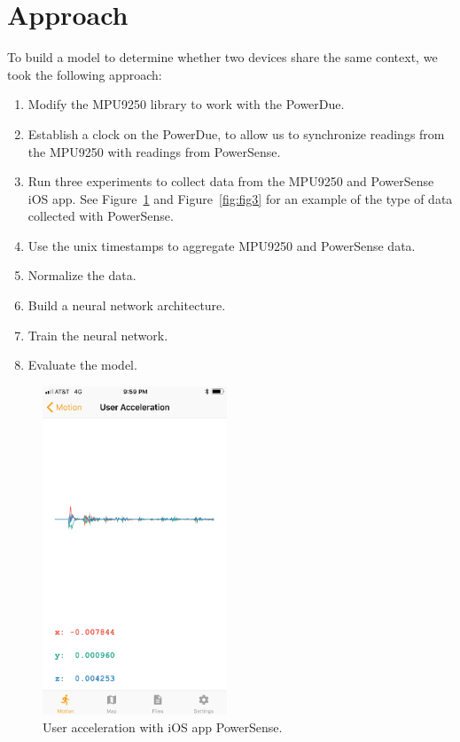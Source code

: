 \documentclass[journal]{IEEEtranTIE}
\begin{document}
\section{Approach}

To build a model to determine whether two devices share the same context, we
took the following approach:

\begin{enumerate}
\item Modify the MPU9250 library to work with the PowerDue.
\item Establish a clock on the PowerDue, to allow us to synchronize readings
      from the MPU9250 with readings from PowerSense.
\item Run three experiments to collect data from the MPU9250 and PowerSense iOS
      app. See Figure~\ref{fig:fig2} and Figure~\ref{fig:fig3} for an example of
      the type of data collected with PowerSense.
\item Use the unix timestamps to aggregate MPU9250 and PowerSense data.
\item Normalize the data.
\item Build a neural network architecture.
\item Train the neural network.
\item Evaluate the model.
\end{enumerate}

\begin{figure}[!t]\centering
	\includegraphics[width=5.5cm]{acceleration}
	\caption{User acceleration with iOS app PowerSense.}\label{fig:fig2}
\end{figure}
\end{document}
